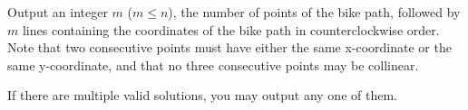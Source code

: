 \begin{Output}
  Output an integer $m$ ($m\leq n$), the number of points of the bike path,
  followed by $m$ lines containing the coordinates of the bike path in counterclockwise order.
  Note that two consecutive points must have either the same x-coordinate or the same y-coordinate, and that no three consecutive points may be collinear.

  If there are multiple valid solutions, you may output any one of them.
\end{Output}
